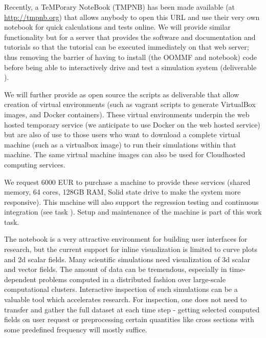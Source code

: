\begin{workpackage}
\begin{tasklist}
\begin{task}[lead=USO,id=oommf-nb-ve,title=\OOMMFNB{} online and downloadable virtual environments,PM=3]
  Recently, a TeMPorary \Jupyter NoteBook (TMPNB) has been made available (at
  \href{http://tmpnb.org}{http://tmpnb.org}) that allows anybody to
  open this URL and use their very own \Jupyter notebook for quick
  calculations and tests online. We will provide similar functionality
  but for a server that provides the \OOMMFNB{} software and \OOMMFNB{}
  documentation and tutorials so that the tutorial can be executed
  immediately on that web server; thus removing the barrier of having
  to install (the OOMMF and \Jupyter notebook) code before being able to interactively drive and test a
  simulation system (deliverable ).

  We will further provide as open source the scripts as deliverable
   that allow
  creation of virtual environments (such as vagrant scripts to
  generate VirtualBox \cite{Virtualbox} images, and Docker
  \cite{Docker} containers). These virtual environments underpin the
  web hosted temporary \OOMMFNB{} service (we anticipate to use Docker
  on the web hosted service) but are also of use to those users who
  want to download a complete virtual machine (such as a virtualbox
  image) to run their simulations within that machine. The same
  virtual machine images can also be used for Cloudhosted computing services.

  We request 6000 EUR to purchase a machine to provide these
  services (shared memory, 64 cores, 128GB RAM, Solid state drive
  to make the system more responsive). This machine will also support
  the regression testing and continuous integration (see task
  ). Setup and
  maintenance of the machine is part of this work task.
\end{task}


\begin{task}[title=Visualization system for 3d data in web-notebook
, id=cfd-vis]

The \Jupyter notebook is a very attractive environment for building
user interfaces for research, but the current support for inline
visualization is limited to curve plots and 2d scalar fields.  Many
scientific simulations need visualization of 3d scalar and vector
fields.  The amount of data can be tremendous, especially in
time-dependent problems computed in a distributed fashion over
large-scale computational clusters. Interactive inspection of such
simulations can be a valuable tool which accelerates research. For
inspection, one does not need to transfer and gather the full dataset
at each time step - getting selected computed fields on user request
or preprocessing certain quantities like cross sections with some
predefined frequency will mostly suffice.


\end{task}
\end{tasklist}
\end{workpackage}
